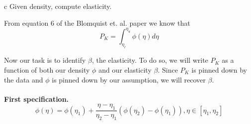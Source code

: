 \documentclass{article}
\begin{document}
\begin{problem}{c}
Given density, compute elasticity.
\end{problem}
\begin{solution}

From equation 6 of the Blomquist et. al. paper we know that 
\[
P_{K}=\int_{\eta_{\ell}}^{\eta_{u}}\phi(\eta)d\eta
\]

Now our task is to identify $\beta$, the elasticity. To do so, we
will write $P_{K}$ as a function of both our density $\phi$ and
our elasticity $\beta$. Since $P_{K}$ is pinned down by the data
and $\phi$ is pinned down by our assumption, we will recover $\beta$. 

\paragraph{First specification.
\[
\ensuremath{\phi(\eta)=\phi\left(\eta_{1}\right)+\frac{\eta-\eta_{1}}{\eta_{2}-\eta_{1}}\left(\phi\left(\eta_{2}\right)-\phi\left(\eta_{1}\right)\right),\eta\in\left[\eta_{1},\eta_{2}\right]}
\]
}


\end{solution}
\end{document}
